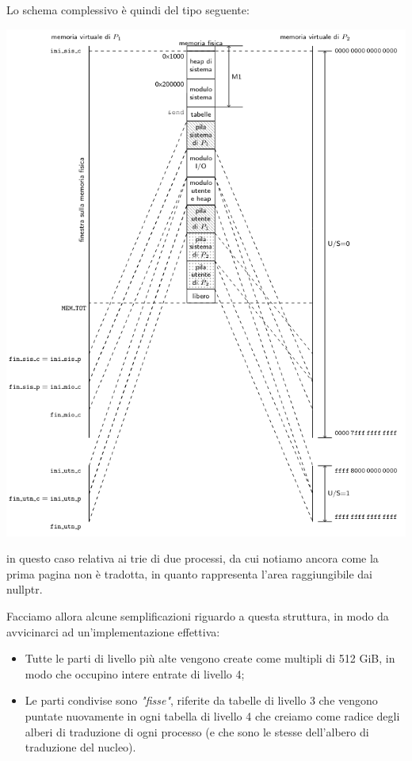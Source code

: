 \documentclass[a4paper,11pt]{article}
\begin{document}
\noindent
\begin{minipage}{\textwidth}
Lo schema complessivo è quindi del tipo seguente:
\begin{center}
	\includegraphics[scale=0.8]{../figures/mem_map.png}
\end{center}
in questo caso relativa ai trie di due processi, da cui notiamo ancora come la prima pagina non è tradotta, in quanto rappresenta l'area raggiungibile dai nullptr.
\end{minipage}

\par\bigskip

Facciamo allora alcune semplificazioni riguardo a questa struttura, in modo da avvicinarci ad un'implementazione effettiva:
\begin{itemize}
	\item Tutte le parti di livello più alte vengono create come multipli di 512 GiB, in modo che occupino intere entrate di livello 4;
	\item Le parti condivise sono \textit{"fisse"}, riferite da tabelle di livello 3 che vengono puntate nuovamente in ogni tabella di livello 4 che creiamo come radice degli alberi di traduzione di ogni processo (e che sono le stesse dell'albero di traduzione del nucleo). 
\end{itemize}
\end{document}

